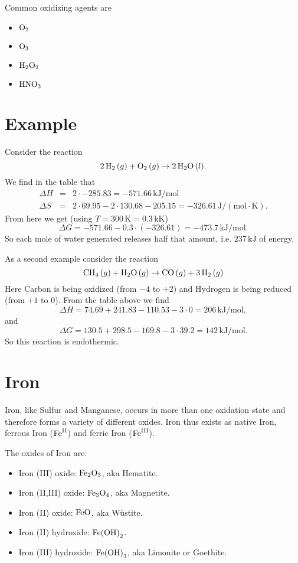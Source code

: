 \documentclass[a4paper,14pt]{extarticle}
\def\H{{\rm H}}
\def\O{{\rm O}}
\def\N{{\rm N}}
\def\C{{\rm C}}
\def\Fe{{\rm Fe}}
\def\II{{\rm II}}
\def\III{{\rm III}}
\begin{document}
Common oxidizing agents are
\begin{itemize}
    \item $\O_2$
    \item $\O_3$
    \item $\H_2\O_2$
    \item $\H\N\O_3$
\end{itemize}


\section{Example}

Consider the reaction
\[
    2 \,\H_2 \,(g) + \O_2 \,(g) \rightarrow 2 \,\H_2\O \,(l).
\]
We find in the table that
\[
    \begin{array}{rcl}
        \Delta H &=& 2 \cdot -285.83 = -571.66 \,\text{kJ}/\text{mol} \\
        \Delta S &=& 2 \cdot 69.95 - 2 \cdot 130.68 - 205.15 = -326.61 \,\text{J}/(\text{mol}\cdot \text{K}).
    \end{array}
\]
From here we get (using $T = 300 \,\text{K} = 0.3 \,\text{kK}$)
\[
    \Delta G = -571.66 - 0.3 \cdot (-326.61) = -473.7 \,\text{kJ}/\text{mol}.
\]
So each mole of water generated releases half that amount, i.e. $237 \,\text{kJ}$ of energy.

As a second example consider the reaction
\[
    \C\H_4 \,(g)+ \H_2\O \,(g)\rightarrow \C\O \,(g)+ 3\,\H_2\,(g)
\]
Here Carbon is being oxidized (from $-4$ to $+2$) and Hydrogen is being reduced (from $+1$ to $0$).
From the table above we find
\[
    \Delta H = 74.69 + 241.83 - 110.53 - 3\cdot 0 = 206 \,\text{kJ}/\text{mol},
\]
and
\[
    \Delta G = 130.5 + 298.5 - 169.8 - 3\cdot 39.2 = 142 \,\text{kJ}/\text{mol}.
\]
So this reaction is endothermic.


\section{Iron}
Iron, like Sulfur and Manganese, occurs in more than one oxidation state and therefore forms a variety of different
oxides.  Iron thus exists as native Iron, ferrous Iron ($\Fe^{\II}$) and ferric Iron ($\Fe^{\III}$).

The oxides of Iron are:

\begin{itemize}
    \item Iron (III) oxide: $\Fe_2\O_3$, aka Hematite.
    \item Iron (II,III) oxide: $\Fe_3\O_4$, aka Magnetite.
    \item Iron (II) oxide: $\Fe\O$, aka Wüstite.
    \item Iron (II) hydroxide: $\Fe{(\O\H)}_2$.
    \item Iron (III) hydroxide: $\Fe{(\O\H)}_3$, aka Limonite or Goethite.
\end{itemize}
\end{document}

